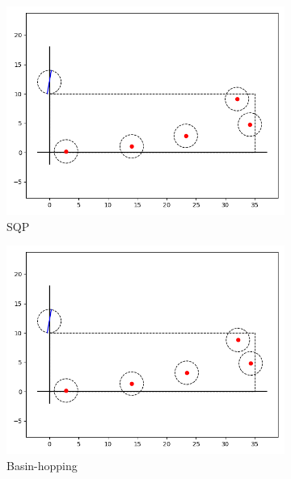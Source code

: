 \documentclass[12pt]{article}
\begin{document}
\begin{figure}
\medskip
\begin{subfigure}{.33\textwidth}
    \centering
    \includegraphics[width=\textwidth]{sqp-layout.png}
    \caption{SQP}    
\end{subfigure}\hfil %
\begin{subfigure}{.33\textwidth}
    \includegraphics[width=\textwidth]{basinhopping-layout.png}
    \caption{Basin-hopping}
\end{subfigure}\hfil %
\begin{subfigure}{.33\textwidth}

\end{subfigure}
\end{figure}
\end{document}
